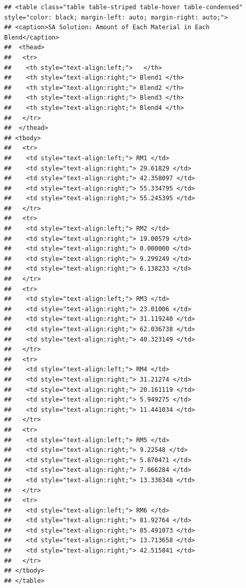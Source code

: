 \documentclass[
]{article}
\begin{document}
\begin{verbatim}
## <table class="table table-striped table-hover table-condensed" style="color: black; margin-left: auto; margin-right: auto;">
## <caption>SA Solution: Amount of Each Material in Each Blend</caption>
##  <thead>
##   <tr>
##    <th style="text-align:left;">   </th>
##    <th style="text-align:right;"> Blend1 </th>
##    <th style="text-align:right;"> Blend2 </th>
##    <th style="text-align:right;"> Blend3 </th>
##    <th style="text-align:right;"> Blend4 </th>
##   </tr>
##  </thead>
## <tbody>
##   <tr>
##    <td style="text-align:left;"> RM1 </td>
##    <td style="text-align:right;"> 29.61829 </td>
##    <td style="text-align:right;"> 42.358097 </td>
##    <td style="text-align:right;"> 55.334795 </td>
##    <td style="text-align:right;"> 55.245395 </td>
##   </tr>
##   <tr>
##    <td style="text-align:left;"> RM2 </td>
##    <td style="text-align:right;"> 19.00579 </td>
##    <td style="text-align:right;"> 0.000000 </td>
##    <td style="text-align:right;"> 9.299249 </td>
##    <td style="text-align:right;"> 6.138233 </td>
##   </tr>
##   <tr>
##    <td style="text-align:left;"> RM3 </td>
##    <td style="text-align:right;"> 23.01006 </td>
##    <td style="text-align:right;"> 31.119240 </td>
##    <td style="text-align:right;"> 62.036738 </td>
##    <td style="text-align:right;"> 40.323149 </td>
##   </tr>
##   <tr>
##    <td style="text-align:left;"> RM4 </td>
##    <td style="text-align:right;"> 31.21274 </td>
##    <td style="text-align:right;"> 20.161119 </td>
##    <td style="text-align:right;"> 5.949275 </td>
##    <td style="text-align:right;"> 11.441034 </td>
##   </tr>
##   <tr>
##    <td style="text-align:left;"> RM5 </td>
##    <td style="text-align:right;"> 9.22548 </td>
##    <td style="text-align:right;"> 5.870471 </td>
##    <td style="text-align:right;"> 7.666284 </td>
##    <td style="text-align:right;"> 13.336348 </td>
##   </tr>
##   <tr>
##    <td style="text-align:left;"> RM6 </td>
##    <td style="text-align:right;"> 81.92764 </td>
##    <td style="text-align:right;"> 85.491073 </td>
##    <td style="text-align:right;"> 13.713658 </td>
##    <td style="text-align:right;"> 42.515841 </td>
##   </tr>
## </tbody>
## </table>
\end{verbatim}
\end{document}
